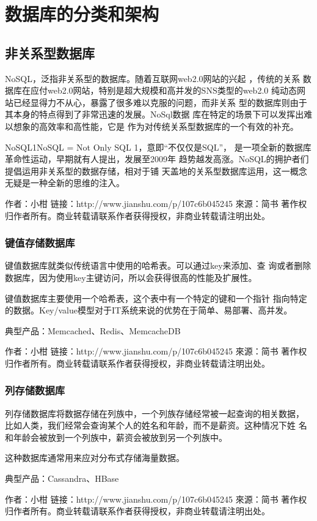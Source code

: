 \section*{数据库的分类和架构}

\subsection*{非关系型数据库}
NoSQL，泛指非关系型的数据库。随着互联网web2.0网站的兴起
，传统的关系
数据库在应付web2.0网站，特别是超大规模和高并发的SNS类型的web2.0
纯动态网站已经显得力不从心，暴露了很多难以克服的问题，而非关系
型的数据库则由于其本身的特点得到了非常迅速的发展。NoSql数据
库在特定的场景下可以发挥出难以想象的高效率和高性能，它是
作为对传统关系型数据库的一个有效的补充。

NoSQL1NoSQL = Not Only SQL 1，意即“不仅仅是SQL”，
是一项全新的数据库革命性运动，早期就有人提出，发展至2009年
趋势越发高涨。NoSQL的拥护者们提倡运用非关系型的数据存储，相对于铺
天盖地的关系型数据库运用，这一概念无疑是一种全新的思维的注入。

作者：小柑
链接：http://www.jianshu.com/p/107c6b045245
來源：简书
著作权归作者所有。商业转载请联系作者获得授权，非商业转载请注明出处。
\subsubsection*{键值存储数据库}
键值数据库就类似传统语言中使用的哈希表。可以通过key来添加、查
询或者删除数据库，因为使用key主键访问，所以会获得很高的性能及扩展性。

键值数据库主要使用一个哈希表，这个表中有一个特定的键和一个指针
指向特定的数据。Key/value模型对于IT系统来说的优势在于简单、易部署、高并发。

典型产品：Memcached、Redis、MemcacheDB

作者：小柑
链接：http://www.jianshu.com/p/107c6b045245
來源：简书
著作权归作者所有。商业转载请联系作者获得授权，非商业转载请注明出处。
\subsubsection*{列存储数据库}
列存储数据库将数据存储在列族中，一个列族存储经常被一起查询的相关数据，
比如人类，我们经常会查询某个人的姓名和年龄，而不是薪资。这种情况下姓
名和年龄会被放到一个列族中，薪资会被放到另一个列族中。

这种数据库通常用来应对分布式存储海量数据。

典型产品：Cassandra、HBase

作者：小柑
链接：http://www.jianshu.com/p/107c6b045245
來源：简书
著作权归作者所有。商业转载请联系作者获得授权，非商业转载请注明出处。
